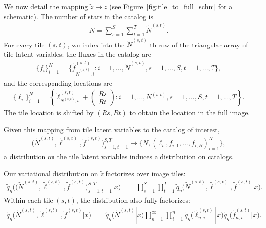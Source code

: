 We now detail the mapping $\tilde z\mapsto z$ (see Figure~\ref{fig:tile_to_full_schm} for a schematic).  
The number of stars in the catalog is 
\begin{align}
    N = \sum_{s=1}^{S}\sum_{t=1}^T \tilde N^{(s, t)}. 
\end{align}
For every tile $(s,t)$, we index into the $\tilde N^{(s,t)}$-th
row of the triangular array of tile latent variables:
the fluxes in the catalog are
\begin{align}
    \{f_i\}_{i=1}^N = \Big\{\tilde f_{\tilde N^{(s, t)}, i}^{(s, t)} : i = 1, ..., \tilde N^{(s, t)}, s = 1, ..., S, t = 1, ..., T \Big\},
\end{align}
and the corresponding locations are
\begin{align}
    \{\ell_i\}_{i = 1}^N = \left\{\tilde \ell_{N^{(s, t)}, i}^{(s, t)} + 
    \begin{pmatrix}
    Rs \\ Rt
    \end{pmatrix} 
    : i = 1, ..., N^{(s, t)}, s = 1, ..., S, t = 1, ..., T\right\}. 
\end{align}
The tile location is shifted by $(Rs, Rt)$ to obtain the location in the full image. 

Given this mapping from tile latent variables to the catalog of interest, 
\begin{align}
 \big(\tilde N^{(s, t)}, \tilde \ell^{(s, t)}, \tilde f^{(s, t)}\big)_{s=1, t = 1}^{S, T}
\mapsto     
\{N, (\ell_i, f_{i,1}, ..., f_{i,B})_{i = 1}^N\},
\label{eq:patch_to_full_map}
\end{align}
a distribution on the tile latent variables induces a distribution on catalogs. 

Our variational distribution on $\tilde z$ factorizes over image tiles:
\begin{align}
    \tilde q_\eta\big( \big(\tilde N^{(s, t)}, \tilde \ell^{(s, t)}, \tilde f^{(s, t)}\big)_{s=1, t = 1}^{S, T}|x\big) 
    &=
    \prod_{s = 1}^S \prod_{t=1}^T
    \tilde q_\eta\big(\tilde N^{(s, t)}, \tilde \ell^{(s, t)}, \tilde f^{(s, t)} | x\big).
    \label{eq:factorize_patches}
\end{align}
Within each tile $(s,t)$, the distribution also fully factorizes: 
\begin{align}
    \tilde q_\eta\big(\tilde N^{(s, t)}, \tilde \ell^{(s, t)}, \tilde f^{(s, t)} | x\big)
    &= 
    \tilde q_\eta\big(\tilde N^{(s, t)} | x\big)
    \prod_{n = 1}^\infty \prod_{i = 1}^n 
    \tilde q_\eta\big(\tilde \ell_{n,i}^{(s, t)} | x\big)
    \tilde q_\eta\big(\tilde f_{n,i}^{(s, t)} | x\big).
    \label{eq:factorize_within_patch}
\end{align}


